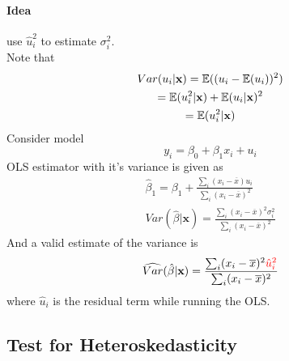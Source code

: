 \documentclass[]{article}
\begin{document}
			\paragraph{Idea} use $\hat{u}_i^2$ to estimate $\sigma_i^2$.\\
			Note that  
			\begin{gather*}
				Var(u_i | \textbf{x}) = \mathbb{E}({(u_i - \mathbb{E}({u_i}))^2}) \\
				= \mathbb{E}({u_i^2 | \textbf{x}}) + \mathbb{E}({u_i | \textbf{x}})^2 \\
				= \mathbb{E}({u_i^2 | \textbf{x}})
			\end{gather*}
			Consider model 
			\[
				y_i = \beta_0 + \beta_1 x_i + u_i
			\]
			OLS estimator with it's variance is given as 
			\begin{gather*}
				\hat{\beta}_1 = \beta_1 + \frac{\sum_i (x_i - \overline{x})u_i}{\sum_i (x_i - \overline{x})^2} \\
				Var(\hat{\beta} | \textbf{x}) = \frac{\sum_i(x_i - \overline{x})^2 \sigma_i^2}{\sum_i(x_i - \overline{x})^2} 
			\end{gather*}
			And a valid estimate of the variance is
			\begin{gather*}
				\widehat{Var}(\hat{\beta} | \textbf{x}) = \frac{\sum_i(x_i - \overline{x})^2 \textcolor{red}{\hat{u}_i^2}}{\sum_i(x_i - \overline{x})^2}
			\end{gather*}
			where $\hat{u}_i$ is the residual term while running the OLS.
		\subsection{Test for Heteroskedasticity}
\end{document}
